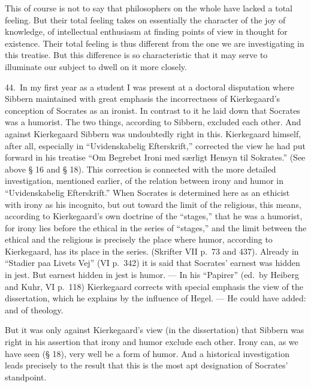 \documentclass[12pt]{book}
\newcommand{\opage}[1]{\marginnote{\footnotesize\textit{[#1]}}}
\begin{document}
This of course is not to say that philosophers on the whole have lacked a total feeling. But
their total feeling takes on essentially the character of the joy of knowledge, of intellectual
enthusiasm at finding points of view in thought for existence. Their total feeling is thus
different from the one we are investigating in this treatise. But this difference is so
characteristic that it may serve to illuminate our subject to dwell on it more closely.

44.~In my first year as a student I was present at a doctoral disputation where Sibbern
maintained with great emphasis the incorrectness of Kierkegaard's conception of Socrates as an
ironist. In contrast to it he laid down that Socrates was a humorist. The two things, according
to Sibbern, excluded each other. And against Kierkegaard Sibbern was undoubtedly right in this.
Kierkegaard himself, after all, especially in ``Uvidenskabelig Efterskrift,'' corrected the view
he had put forward in his treatise ``Om Begrebet Ironi med særligt Hensyn til Sokrates.'' (See
above § 16 and § 18). This correction is connected with the more detailed investigation,
mentioned earlier, of the relation between irony and humor in ``Uvidenskabelig Efterskrift.''
When Socrates is determined here as an ethicist with irony as his incognito, but out toward the
limit of the religious, this means, according to Kierkegaard's own doctrine of the ``stages,''
that he was a humorist, for irony lies before the ethical in the series of ``stages,'' and the
limit between the ethical and the religious is precisely the place where humor, according to
Kierkegaard, has its place in the series. (Skrifter VII p.~73 and 437). Already in ``Stadier paa
Livets Vej'' (VI p.~342) it is said that Socrates' earnest was hidden in jest. But earnest hidden
in jest is humor. --- In his ``Papirer'' (ed.\ by Heiberg and Kuhr, VI p.~118) Kierkegaard
corrects with special emphasis the view of the dissertation, \opage{148}which he explains by the
influence of Hegel. --- He could have added: and of theology.

But it was only against Kierkegaard's view (in the dissertation) that Sibbern was right in his
assertion that irony and humor exclude each other. Irony can, as we have seen (§ 18), very well
be a form of humor. And a historical investigation leads precisely to the result that this is
the most apt designation of Socrates' standpoint.
\end{document}
